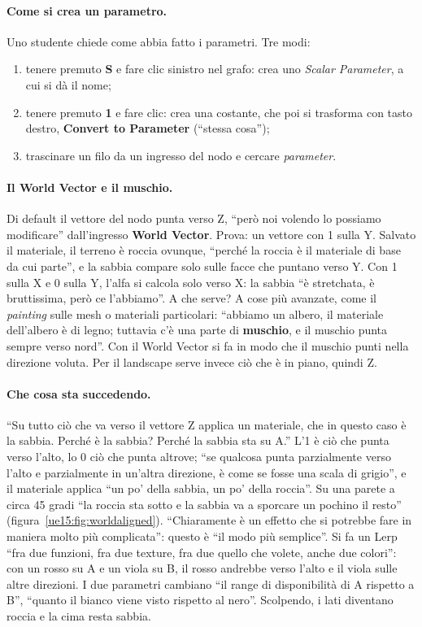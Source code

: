 \paragraph{Come si crea un parametro.} Uno studente chiede come abbia fatto i parametri.
Tre modi:
\begin{enumerate}
  \item tenere premuto \textbf{S} e fare clic sinistro nel grafo: crea uno \emph{Scalar
        Parameter}, a cui si dà il nome;
  \item tenere premuto \textbf{1} e fare clic: crea una costante, che poi si trasforma con
        tasto destro, \textbf{Convert to Parameter} (``stessa cosa'');
  \item trascinare un filo da un ingresso del nodo e cercare \emph{parameter}.
\end{enumerate}

\paragraph{Il World Vector e il muschio.} Di default il vettore del nodo punta verso Z, ``però
noi volendo lo possiamo modificare'' dall'ingresso \textbf{World Vector}. Prova: un vettore
con 1 sulla Y. Salvato il materiale, il terreno è roccia ovunque, ``perché la roccia è il
materiale di base da cui parte'', e la sabbia compare solo sulle facce che puntano verso Y.
Con 1 sulla X e 0 sulla Y, l'alfa si calcola solo verso X: la sabbia ``è stretchata, è
bruttissima, però ce l'abbiamo''. A che serve? A cose più avanzate, come il \emph{painting}
sulle mesh o materiali particolari: ``abbiamo un albero, il materiale dell'albero è di
legno; tuttavia c'è una parte di \textbf{muschio}, e il muschio punta sempre verso nord''.
Con il World Vector si fa in modo che il muschio punti nella direzione voluta. Per il
landscape serve invece ciò che è in piano, quindi Z.

\paragraph{Che cosa sta succedendo.} ``Su tutto ciò che va verso il vettore Z applica un
materiale, che in questo caso è la sabbia. Perché è la sabbia? Perché la sabbia sta su A.''
L'1 è ciò che punta verso l'alto, lo 0 ciò che punta altrove; ``se qualcosa punta
parzialmente verso l'alto e parzialmente in un'altra direzione, è come se fosse una scala di
grigio'', e il materiale applica ``un po' della sabbia, un po' della roccia''. Su una parete
a circa 45 gradi ``la roccia sta sotto e la sabbia va a sporcare un pochino il resto''
(figura~\ref{ue15:fig:worldaligned}). ``Chiaramente è un effetto che si potrebbe fare in
maniera molto più complicata'': questo è ``il modo più semplice''. Si fa un Lerp ``fra due
funzioni, fra due texture, fra due quello che volete, anche due colori'': con un rosso su A e
un viola su B, il rosso andrebbe verso l'alto e il viola sulle altre direzioni. I due
parametri cambiano ``il range di disponibilità di A rispetto a B'', ``quanto il bianco viene
visto rispetto al nero''. Scolpendo, i lati diventano roccia e la cima resta sabbia.

